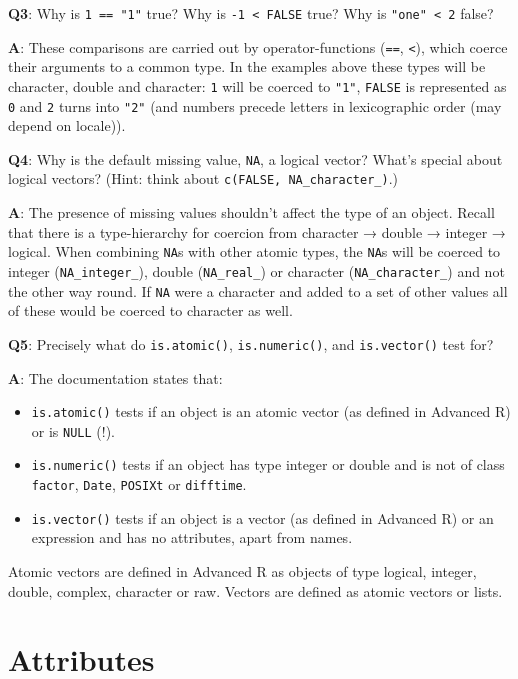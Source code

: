 \documentclass[
]{krantz}
\providecommand{\tightlist}{%
  \setlength{\itemsep}{0pt}\setlength{\parskip}{0pt}}
\begin{document}
\textbf{{Q3}}: Why is \texttt{1\ ==\ "1"} true? Why is \texttt{-1\ \textless{}\ FALSE} true? Why is \texttt{"one"\ \textless{}\ 2} false?

\textbf{{A}}: These comparisons are carried out by operator-functions (\texttt{==}, \texttt{\textless{}}), which coerce their arguments to a common type. In the examples above these types will be character, double and character: \texttt{1} will be coerced to \texttt{"1"}, \texttt{FALSE} is represented as \texttt{0} and \texttt{2} turns into \texttt{"2"} (and numbers precede letters in lexicographic order (may depend on locale)).

\textbf{{Q4}}: Why is the default missing value, \texttt{NA}, a logical vector? What's special about logical vectors? (Hint: think about \texttt{c(FALSE,\ NA\_character\_)}.)

\textbf{{A}}: The presence of missing values shouldn't affect the type of an object. Recall that there is a type-hierarchy for coercion from character → double → integer → logical. When combining \texttt{NA}s with other atomic types, the \texttt{NA}s will be coerced to integer (\texttt{NA\_integer\_}), double (\texttt{NA\_real\_}) or character (\texttt{NA\_character\_}) and not the other way round. If \texttt{NA} were a character and added to a set of other values all of these would be coerced to character as well.

\textbf{{Q5}}: Precisely what do \texttt{is.atomic()}, \texttt{is.numeric()}, and \texttt{is.vector()} test for?

\textbf{{A}}: The documentation states that:

\begin{itemize}
\tightlist
\item
  \texttt{is.atomic()} tests if an object is an atomic vector (as defined in Advanced R) or is \texttt{NULL} (!).
\item
  \texttt{is.numeric()} tests if an object has type integer or double and is not of class \texttt{factor}, \texttt{Date}, \texttt{POSIXt} or \texttt{difftime}.
\item
  \texttt{is.vector()} tests if an object is a vector (as defined in Advanced R) or an expression and has no attributes, apart from names.
\end{itemize}

Atomic vectors are defined in Advanced R as objects of type logical, integer, double, complex, character or raw. Vectors are defined as atomic vectors or lists.

\hypertarget{attributes}{%
\section{Attributes}\label{attributes}}
\end{document}
